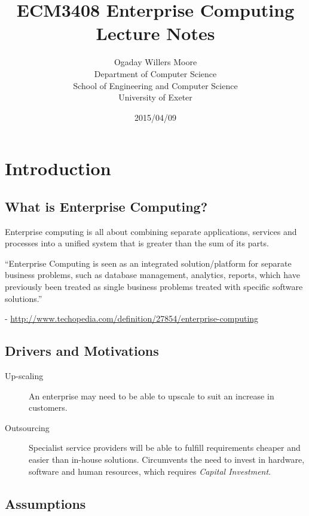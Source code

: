 \documentclass[11pt]{article}
\title{ECM3408 Enterprise Computing Lecture Notes}
\author{Ogaday Willers Moore\\        %
Department of Computer Science\\
School of Engineering and Computer Science\\
University of Exeter}
\date{2015/04/09}
\begin{document}
\maketitle

\tableofcontents

\pagebreak



\section{Introduction}
\label{sec:intro}

\subsection{What is Enterprise Computing?}
Enterprise computing is all about combining separate applications, services and processes into a unified system that is greater than the sum of its parts.
\begin{displayquote}
``Enterprise Computing is seen as an integrated solution/platform for separate business problems, such as database management, analytics, reports, which have previously been treated as single business problems treated with specific software solutions.''
\end{displayquote}

- \url{http://www.techopedia.com/definition/27854/enterprise-computing}

\subsection{Drivers and Motivations}

\begin{description}
\item[Up-scaling] An enterprise may need to be able to upscale to suit an increase in customers.
\item[Outsourcing] Specialist service providers will be able to fulfill requirements cheaper and easier than in-house solutions. Circumvents the need to invest in hardware, software and human resources, which requires \textit{Capital Investment}.
\end{description}

\subsection{Assumptions}
\end{document}
